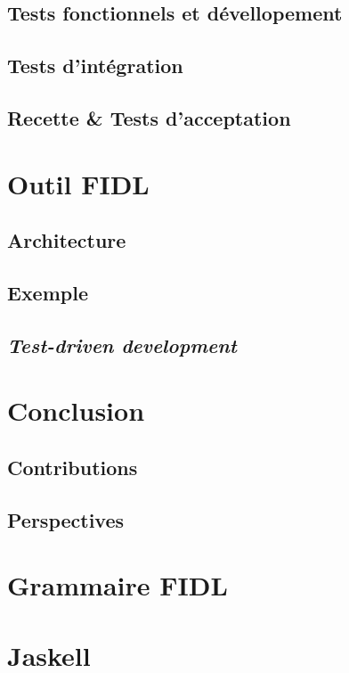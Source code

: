 \documentclass[french,a4paper,leqno,twoside]{book}
\begin{document}
\section{Tests fonctionnels et d\'evellopement}
\section{Tests d'int\'egration}
\section{Recette \& Tests d'acceptation}

\chapter{Outil FIDL}
\section{Architecture}
\section{Exemple}
\section{\emph{Test-driven development}}

\chapter{Conclusion}
\section{Contributions}
\section{Perspectives}

\appendix
\chapter{Grammaire FIDL}
\chapter{Jaskell}
\end{document}
